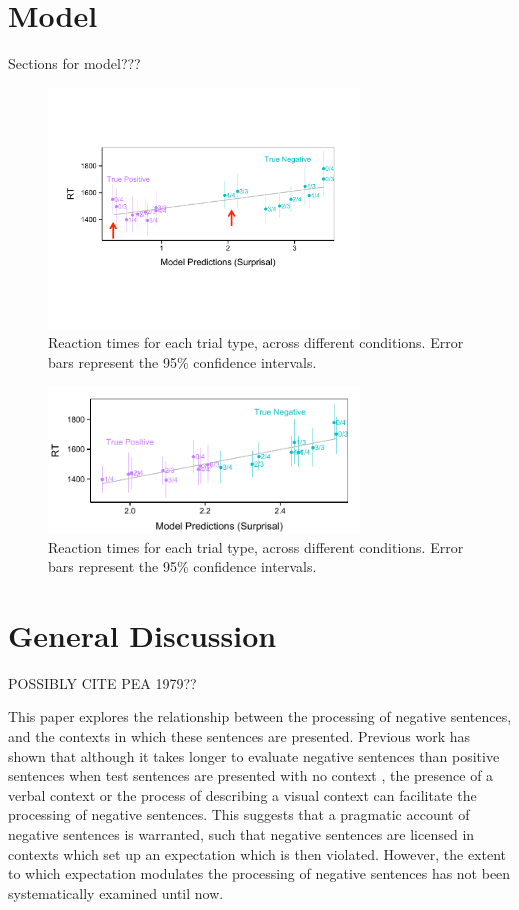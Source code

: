 \documentclass[10pt,letterpaper]{article}
\begin{document}
\section{Model}
Sections for model???

\begin{figure}
\begin{center} 
\includegraphics[width=3.25in]{figures/model1_comparison.pdf}
\caption{\label{fig:addition_subs} Reaction times for each trial type, across different conditions.  Error bars represent the 95\% confidence intervals.}
\end{center} 
\end{figure}

\begin{figure}
\begin{center} 
\includegraphics[width=3.25in]{figures/model2_comparison.pdf}
\caption{\label{fig:addition_subs} Reaction times for each trial type, across different conditions.  Error bars represent the 95\% confidence intervals.}
\end{center} 
\end{figure}


\section{General Discussion}
POSSIBLY CITE PEA 1979??


This paper explores the relationship between the processing of negative sentences, and the contexts in which these sentences are presented.  Previous work has shown that although it takes longer to evaluate negative sentences than positive sentences when test sentences are presented with no context \cite{carpenter1975, just1971, just1976, hclark1972}, the presence of a verbal context \cite{dale2011, glenberg1999, ludtke2006} or the process of describing a visual context \cite{wason1965} can facilitate the processing of negative sentences.  This suggests that a pragmatic account of negative sentences is warranted, such that negative sentences are licensed in contexts which set up an expectation which is then violated.  However, the extent to which expectation modulates the processing of negative sentences has not been systematically examined until now.  
\end{document}
